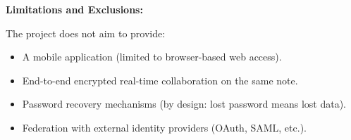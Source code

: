 \textbf{Limitations and Exclusions:}

The project does not aim to provide:
\begin{itemize}
    \item A mobile application (limited to browser-based web access).
    \item End-to-end encrypted real-time collaboration on the same note.
    \item Password recovery mechanisms (by design: lost password means lost data).
    \item Federation with external identity providers (OAuth, SAML, etc.).
\end{itemize}
